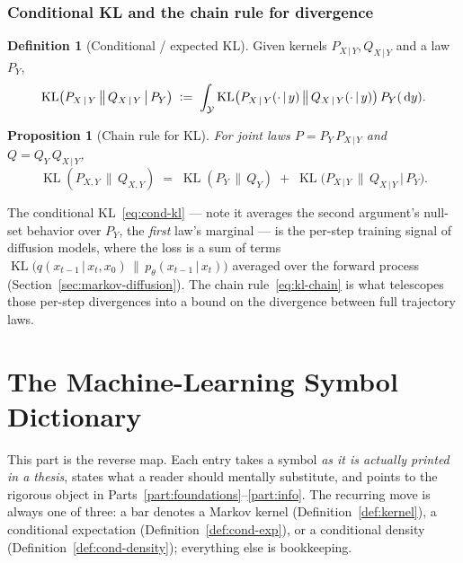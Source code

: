 \documentclass[11pt,oneside]{report}
\theoremstyle{plain}
\newtheorem{proposition}[theorem]{Proposition}
\theoremstyle{definition}
\newtheorem{definition}[theorem]{Definition}
\theoremstyle{remark}
\newcommand{\dd}{\,\mathrm{d}}
\newcommand{\Ycal}{\mathcal{Y}}
\newcommand{\defeq}{\vcentcolon=}
\newcommand{\given}{\,\vert\,}
\DeclareMathOperator{\KL}{KL}
\numberwithin{equation}{chapter}
\begin{document}
\section{Conditional KL and the chain rule for divergence}

\begin{definition}[Conditional / expected KL]\label{def:cond-kl}
Given kernels $P_{X\given Y},Q_{X\given Y}$ and a law $P_Y$,
\begin{equation}\label{eq:cond-kl}
  \KL\bigl(P_{X\given Y}\,\big\|\,Q_{X\given Y}\,\big|\,P_Y\bigr)
   \;\defeq\;\int_\Ycal
     \KL\bigl(P_{X\given Y}(\cdot\given y)\,\big\|\,Q_{X\given Y}(\cdot\given y)\bigr)
     \,P_Y(\dd y).
\end{equation}
\end{definition}

\begin{proposition}[Chain rule for KL]\label{prop:kl-chain}
For joint laws $P=P_Y\,P_{X\given Y}$ and $Q=Q_Y\,Q_{X\given Y}$,
\begin{equation}\label{eq:kl-chain}
  \KL(P_{X,Y}\,\|\,Q_{X,Y})
   \;=\;\KL(P_Y\,\|\,Q_Y)
       \;+\;\KL\bigl(P_{X\given Y}\,\big\|\,Q_{X\given Y}\,\big|\,P_Y\bigr).
\end{equation}
\end{proposition}

The conditional KL~\eqref{eq:cond-kl} --- note it averages the second
argument's null-set behavior over $P_Y$, the \emph{first} law's marginal ---
is the per-step training signal of diffusion models, where the loss is a
sum of terms $\KL\bigl(q(x_{t-1}\given x_t,x_0)\,\|\,p_\theta(x_{t-1}\given
x_t)\bigr)$ averaged over the forward process
(Section~\ref{sec:markov-diffusion}). The chain rule~\eqref{eq:kl-chain} is
what telescopes those per-step divergences into a bound on the divergence
between full trajectory laws.

\part{The Machine-Learning Symbol Dictionary}\label{part:dictionary}

This part is the reverse map. Each entry takes a symbol \emph{as it is
actually printed in a thesis}, states what a reader should mentally
substitute, and points to the rigorous object in
Parts~\ref{part:foundations}--\ref{part:info}. The recurring move is
always one of three: a bar denotes a Markov kernel
(Definition~\ref{def:kernel}), a conditional expectation
(Definition~\ref{def:cond-exp}), or a conditional density
(Definition~\ref{def:cond-density}); everything else is bookkeeping.
\end{document}
